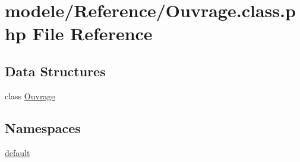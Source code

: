 \hypertarget{_ouvrage_8class_8php}{}\section{modele/\+Reference/\+Ouvrage.class.\+php File Reference}
\label{_ouvrage_8class_8php}
\subsection*{Data Structures}
\begin{DoxyCompactItemize}
\item 
class \hyperlink{class_ouvrage}{Ouvrage}
\end{DoxyCompactItemize}
\subsection*{Namespaces}
\begin{DoxyCompactItemize}
\item 
 \hyperlink{namespacedefault}{default}
\end{DoxyCompactItemize}

